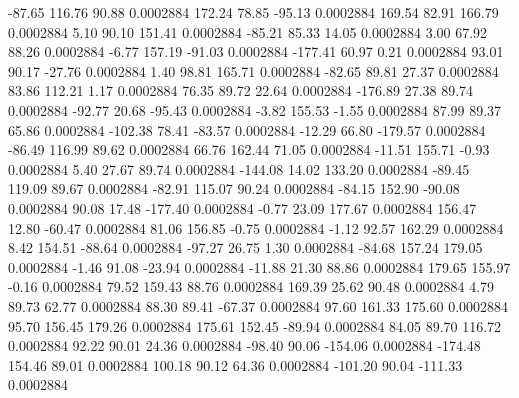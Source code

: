       -87.65      116.76       90.88     0.0002884
      172.24       78.85      -95.13     0.0002884
      169.54       82.91      166.79     0.0002884
        5.10       90.10      151.41     0.0002884
      -85.21       85.33       14.05     0.0002884
        3.00       67.92       88.26     0.0002884
       -6.77      157.19      -91.03     0.0002884
     -177.41       60.97        0.21     0.0002884
       93.01       90.17      -27.76     0.0002884
        1.40       98.81      165.71     0.0002884
      -82.65       89.81       27.37     0.0002884
       83.86      112.21        1.17     0.0002884
       76.35       89.72       22.64     0.0002884
     -176.89       27.38       89.74     0.0002884
      -92.77       20.68      -95.43     0.0002884
       -3.82      155.53       -1.55     0.0002884
       87.99       89.37       65.86     0.0002884
     -102.38       78.41      -83.57     0.0002884
      -12.29       66.80     -179.57     0.0002884
      -86.49      116.99       89.62     0.0002884
       66.76      162.44       71.05     0.0002884
      -11.51      155.71       -0.93     0.0002884
        5.40       27.67       89.74     0.0002884
     -144.08       14.02      133.20     0.0002884
      -89.45      119.09       89.67     0.0002884
      -82.91      115.07       90.24     0.0002884
      -84.15      152.90      -90.08     0.0002884
       90.08       17.48     -177.40     0.0002884
       -0.77       23.09      177.67     0.0002884
      156.47       12.80      -60.47     0.0002884
       81.06      156.85       -0.75     0.0002884
       -1.12       92.57      162.29     0.0002884
        8.42      154.51      -88.64     0.0002884
      -97.27       26.75        1.30     0.0002884
      -84.68      157.24      179.05     0.0002884
       -1.46       91.08      -23.94     0.0002884
      -11.88       21.30       88.86     0.0002884
      179.65      155.97       -0.16     0.0002884
       79.52      159.43       88.76     0.0002884
      169.39       25.62       90.48     0.0002884
        4.79       89.73       62.77     0.0002884
       88.30       89.41      -67.37     0.0002884
       97.60      161.33      175.60     0.0002884
       95.70      156.45      179.26     0.0002884
      175.61      152.45      -89.94     0.0002884
       84.05       89.70      116.72     0.0002884
       92.22       90.01       24.36     0.0002884
      -98.40       90.06     -154.06     0.0002884
     -174.48      154.46       89.01     0.0002884
      100.18       90.12       64.36     0.0002884
     -101.20       90.04     -111.33     0.0002884
